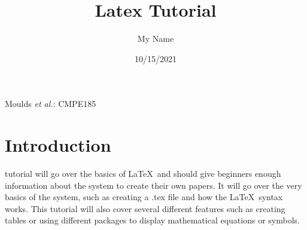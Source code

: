 \documentclass[12pt,journal,compsoc]{IEEEtran}
\begin{document}
\title{Latex Tutorial}
\author{My Name}

\date{10/15/2021}

%
{Moulds \MakeLowercase{\textit{et al.}}: CMPE185}



\maketitle



\section{Introduction}

 tutorial will go over the basics of \LaTeX\ and should give beginners enough information about the system to create their own papers. It will go over the very basics of the system, such as creating a .tex file and how the \LaTeX\ syntax works. This tutorial will also cover several different features such as creating tables or using different packages to display mathematical equations or symbols. \\\\
\end{document}
